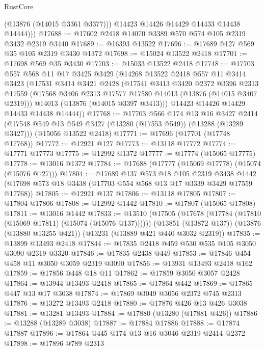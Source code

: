 \begin{lexlean}{RustCore}
\begin{coremodule}
            (@13876 (@14015 @3361 @3377)))
          @14423
          @14426
          @14429
          @14433
          @14438
          @14444)))
@17688 := @17602 @2418 @14070 @3389 @570 @574 @105 @2319 @3432 @2319 @3440
@17689 := @16393 @13522
@17696 := @17689 @127 @569 @35 @105 @2319 @3430 @1372
@17698 := @15024 @13522 @2418
@17701 := @17698 @569 @35 @3430
@17703 := @15033 @13522 @2418
@17748 := @17703
    @557
    @568
    @11
    @17
    @3425
    @3429
    (@14268
      @13522
      @2418
      @557
      @11
      @3414
      @3423
      (@17531
        @3414
        @3421
        @2428
        (@17541
          @3413
          @3420
          @2372
          @3396
          @2313
          @17559
          (@17568 @3406 @2313 @17577 @17580 @14013 (@13876 (@14015 @3407 @2319)))
          @14013
          (@13876 (@14015 @3397 @3413)))
        @14423
        @14426
        @14429
        @14433
        @14438
        @14444))
@17768 := @17703
    @566
    @174
    @13
    @16
    @3427
    @2414
    (@17548 @549 @13 @549 @3427 (@13280 (@17553 @549)) (@13288 (@13289 @3427)))
    (@15056 @13522 @2418)
@17771 := @17696 (@17701 (@17748 @17768))
@17772 := @12921 @127
@17773 := @13118 @17772
@17774 := @17771 @17773
@17775 := @12992 @1372
@17777 := @17774 (@15065 @17775)
@17778 := @13016 @1372
@17784 := @17688 (@17777 (@15069 @17778) (@15074 (@15076 @127)))
@17804 := @17689
    @137
    @573
    @18
    @105
    @2319
    @3438
    @1442
    (@17698 @573 @18 @3438 (@17703 @554 @568 @13 @17 @3339 @3429 @17559 @17768))
@17805 := @12921 @137
@17806 := @13118 @17805
@17807 := @17804 @17806
@17808 := @12992 @1442
@17810 := @17807 (@15065 @17808)
@17811 := @13016 @1442
@17833 := @13510
    (@17505 (@17678 (@17784 (@17810 (@15069 @17811) (@15074 (@15076 @137))))))
    (@13851 (@13872 @137))
    (@13876 (@13880 @13255 @421))
    (@13231 (@13889 @421 @440 @3032 @2319))
@17835 := @13899 @13493 @2418
@17844 := @17835 @2418 @459 @530 @535 @105 @3050 @3090 @2319 @3320
@17846 := @17835 @2438 @449
@17853 := @17846 @454 @458 @11 @3050 @3059 @2319 @3090
@17856 := @13931 @13493 @2418 @162
@17859 := @17856 @448 @18 @11
@17862 := @17859 @3050 @3057 @2428
@17864 := @13944 @13493 @2418
@17865 := @17864 @442
@17869 := @17865 @447 @13 @17 @3038
@17874 := @17869 @3049 @3056 @2372 @745 @2313
@17876 := @13272 @13493 @2418
@17880 := @17876 @426 @13 @426 @3038
@17881 := @13281 @13493
@17884 := @17880 (@13280 (@17881 @426))
@17886 := @13288 (@13289 @3038)
@17887 := @17884 @17886
@17888 := @17874 @17887
@17896 := @17864 @445 @174 @13 @16 @3046 @2319 @2414 @2372
@17898 := @17896 @789 @2313

\end{coremodule}
\end{lexlean}
